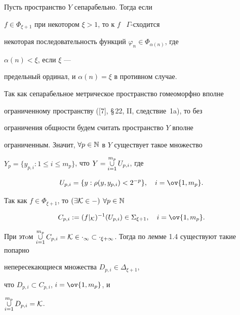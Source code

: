  


\begin{lems} 


Пусть пространство $Y$ сепарабельно. Тогда если 


$f\in\Phi_{\xi+1}$ при некотором $\xi{>}1$, то к $f$ \ $\Gamma$-сходится 


некоторая последовательность функций $\varphi_n\in\Phi_{\alpha(n)}$, где 


$\alpha(n)<\xi$, если $\xi$ --- 


предельный ординал, и $\alpha(n)=\xi$ в противном случае. 


\end{lems} 


 


\begin{pf} 


Так как сепарабельное метрическое пространство гомеоморфно вполне 


ограниченному пространству ([7], \S\,22, II, следствие~1a), то без 


ограничения общности будем считать пространство $Y$ вполне 


ограниченным. Значит, $\forall p\in\Bbb N$ в $Y$ существует такое множество 


$Y_p=\{y_{p,i}:1\le i\le m_p\}$, что $Y=\mathop{\cup}\limits^{m_p}_{i=1}U_{p,i}$, где 


$$ 


U_{p,i}=\{y:\rho(y,y_{p,i})<2^{-p}\},\quad i=\ov{1,m_p}. 


$$ 


 


Так как $f\in\Phi_{\xi+1}$, то $(\exists\cal K\in\Gamma)$ $\forall 


p\in\Bbb N$ 


$$ 


C_{p,i}:=(f|_{\cal K})^{-1}(U_{p,i})\in\Sigma_{\xi+1},\quad 


i=\ov{1,m_p}. 


$$ 


При этoм $\mycup^{m_p}_{i=1}C_{p,i}=\cal K\in\Delta_1\subset 


\Delta_{\xi+1}$. Тогда по лемме 1.4 существуют такие попарно 


непересекающиеся множества $D_{p,i}\in\Delta_{\xi+1}$, 


что $D_{p,i}\subset C_{p,i}$, $i=\ov{1,m_p}$, и 


$\mathop{\cup}\limits^{m_p}_{i=1}D_{p,i}=\cal K$. 



\end{pf}
